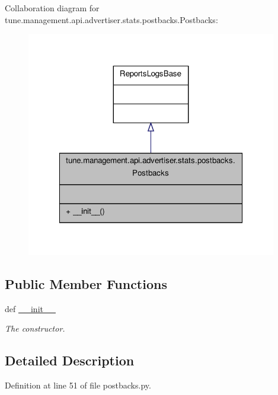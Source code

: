 Collaboration diagram for tune.\-management.\-api.\-advertiser.\-stats.\-postbacks.\-Postbacks\-:
\nopagebreak
\begin{figure}[H]
\begin{center}
\leavevmode
\includegraphics[width=310pt]{classtune_1_1management_1_1api_1_1advertiser_1_1stats_1_1postbacks_1_1Postbacks__coll__graph}
\end{center}
\end{figure}
\subsection*{Public Member Functions}
\begin{DoxyCompactItemize}
\item 
def \hyperlink{classtune_1_1management_1_1api_1_1advertiser_1_1stats_1_1postbacks_1_1Postbacks_a4c0dc04eacce08fdf61e8a9812892645}{\-\_\-\-\_\-init\-\_\-\-\_\-}
\begin{DoxyCompactList}\small\item\em The constructor. \end{DoxyCompactList}\end{DoxyCompactItemize}


\subsection{Detailed Description}


Definition at line 51 of file postbacks.\-py.



